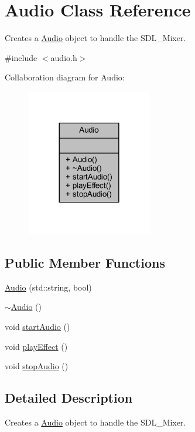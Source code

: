 \hypertarget{class_audio}{\section{Audio Class Reference}
\label{class_audio}
}


Creates a \hyperlink{class_audio}{Audio} object to handle the S\+D\+L\+\_\+\+Mixer.  




{\ttfamily \#include $<$audio.\+h$>$}



Collaboration diagram for Audio\+:\nopagebreak
\begin{figure}[H]
\begin{center}
\leavevmode
\includegraphics[width=156pt]{class_audio__coll__graph}
\end{center}
\end{figure}
\subsection*{Public Member Functions}
\begin{DoxyCompactItemize}
\item 
\hyperlink{class_audio_ae1900ee0e5254fe0c96e0b423ea02777}{Audio} (std\+::string, bool)
\item 
\hyperlink{class_audio_ae8f54deecb5f48511aaab469e80294d6}{$\sim$\+Audio} ()
\item 
void \hyperlink{class_audio_a15f1ea89039f6dbbb2260bb34f9dabdd}{start\+Audio} ()
\item 
void \hyperlink{class_audio_aea41cc6feaed4b1ab5957ea499509f55}{play\+Effect} ()
\item 
void \hyperlink{class_audio_a5d73ae24c80b37df5f167016de9c9296}{stop\+Audio} ()
\end{DoxyCompactItemize}


\subsection{Detailed Description}
Creates a \hyperlink{class_audio}{Audio} object to handle the S\+D\+L\+\_\+\+Mixer. 

